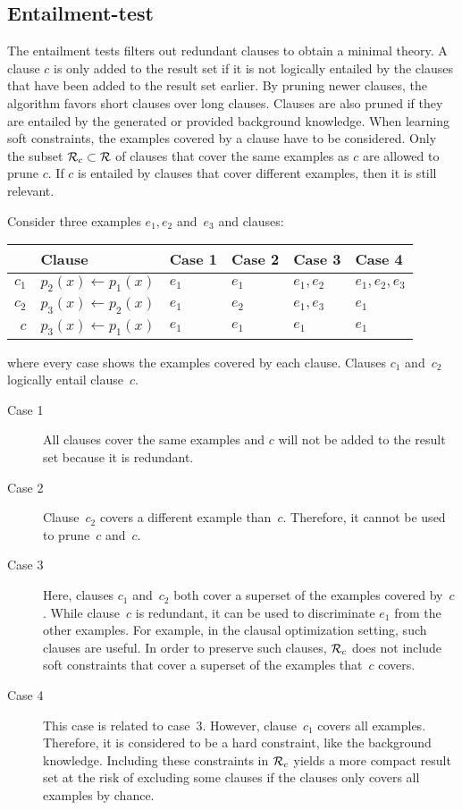 \subsection{Entailment-test}
The entailment tests filters out redundant clauses to obtain a minimal theory.
A clause $c$ is only added to the result set  if it is not logically entailed by the clauses that have been added to the result set earlier.
By pruning newer clauses, the algorithm favors short clauses over long clauses.
Clauses are also pruned if they are entailed by the generated or provided background knowledge.
When learning soft constraints, the examples covered by a clause have to be considered.
Only the subset $\mathcal{R}_c \subset \mathcal{R}$ of clauses that cover the same examples as $c$ are allowed to prune $c$.
If $c$ is entailed by clauses that cover different examples, then it is still relevant.
\begin{example}
	Consider three examples $e_1, e_2$ and~$e_3$ and clauses:
	\begin{table}[!htp]
	\begin{tabularx}{\textwidth}{rl|XXXX}
		& Clause & Case 1 & Case 2 & Case 3 & Case 4 \\
		\midrule
		$c_1$ & $p_2(x) \leftarrow p_1(x)$ & $e_1$ & $e_1$ & $e_1, e_2$ & $e_1, e_2, e_3$\\
		$c_2$ & $p_3(x) \leftarrow p_2(x)$ & $e_1$ & $e_2$ & $e_1, e_3$ & $e_1$ \\
		$c$ & $p_3(x) \leftarrow p_1(x)$ & $e_1$ & $e_1$ & $e_1$ & $e_1$
	\end{tabularx}
	\end{table}
	where every case shows the examples covered by each clause.
	Clauses $c_1$ and~$c_2$ logically entail clause~$c$.

	\begin{description}
		\item[Case 1]
			All clauses cover the same examples and $c$ will not be added to the result set because it is redundant.
		\item[Case 2]
			Clause~$c_2$ covers a different example than~$c$.
			Therefore, it cannot be used to prune~$c$ and~$c$.
		\item[Case 3]
			Here, clauses $c_1$ and~$c_2$ both cover a superset of the examples covered by~$c$.
			While clause~$c$ is redundant, it can be used to discriminate $e_1$ from the other examples.
			For example, in the clausal optimization setting, such clauses are useful.
			In order to preserve such clauses, $\mathcal{R}_c$ does not include soft constraints that cover a superset of the examples that~$c$ covers.
		\item[Case 4]
			This case is related to case~3.
			However, clause~$c_1$ covers all examples.
			Therefore, it is considered to be a hard constraint, like the background knowledge.
			Including these constraints in $\mathcal{R}_c$ yields a more compact result set at the risk of excluding some clauses if the clauses only covers all examples by chance.
	\end{description}

\end{example}

